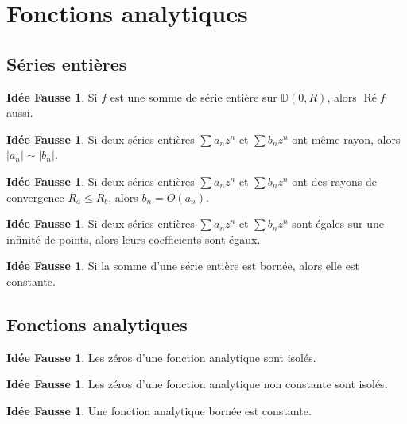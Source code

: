 \documentclass[11pt,a4paper]{article}
\newcommand{\D}{\mathbb{D}}
\DeclareMathOperator{\PR}{\text{Ré}}
\theoremstyle{definition}
\newtheorem{ideeFausse}[theoreme]{Idée Fausse}
\theoremstyle{plain}
\begin{document}
\section{Fonctions analytiques}

\subsection{Séries entières}

\begin{ideeFausse}
Si $f$ est une somme de série entière sur $\D(0,R)$, alors $\PR f$ aussi.
\end{ideeFausse}

\begin{ideeFausse}
Si deux séries entières $\sum a_nz^n$ et $\sum b_nz^n$ ont même rayon, alors $|a_n| \sim |b_n|$.
\end{ideeFausse}

\begin{ideeFausse}
Si deux séries entières $\sum a_nz^n$ et $\sum b_nz^n$ ont  des rayons de convergence $R_a\leq R_b$, alors $b_n = O(a_n)$.
\end{ideeFausse}

\begin{ideeFausse}
Si deux séries entières $\sum a_nz^n$ et $\sum b_nz^n$ sont égales sur une infinité de points, alors leurs coefficients sont égaux.
\end{ideeFausse}

\begin{ideeFausse}
Si la somme d'une série entière est bornée, alors elle est constante.
\end{ideeFausse}


\subsection{Fonctions analytiques}

\begin{ideeFausse}
Les zéros d'une fonction analytique sont isolés.
\end{ideeFausse}

\begin{ideeFausse}
Les zéros d'une fonction analytique non constante sont isolés.
\end{ideeFausse}

\begin{ideeFausse}
Une fonction analytique bornée est constante.
\end{ideeFausse}
\end{document}
